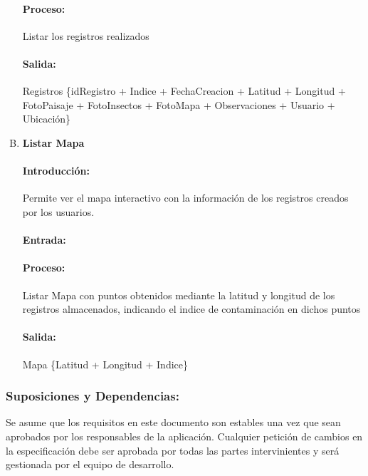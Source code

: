 \begin{enumerate}[A.]
        \paragraph{Proceso:} Listar los registros realizados
        
        \paragraph{Salida:} Registros \{idRegistro + Indice + FechaCreacion + Latitud + Longitud + FotoPaisaje + FotoInsectos + FotoMapa + Observaciones + Usuario + Ubicación\}

        \item \textbf{Listar Mapa}
        
        \paragraph{Introducción:} Permite ver el mapa interactivo con la información de los registros creados por los usuarios.
        
        \paragraph{Entrada:} 
        
        \paragraph{Proceso:} Listar Mapa con puntos obtenidos mediante la latitud y longitud de los registros almacenados, indicando el indice de contaminación en dichos puntos
        
        \paragraph{Salida:} Mapa \{Latitud + Longitud + Indice\}

        \end{enumerate}
         
        \subsubsection{Suposiciones y Dependencias:}
        
            
            Se asume que los requisitos en este documento son estables una vez que sean aprobados por los responsables de la aplicación. Cualquier petición de cambios en la especificación debe ser aprobada por todas las partes intervinientes y será gestionada por el equipo de desarrollo.
            
